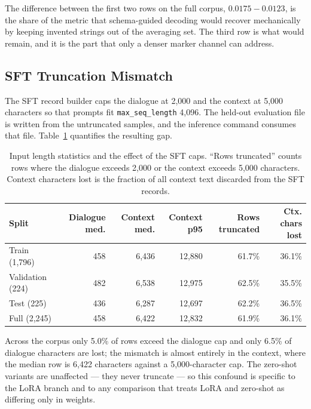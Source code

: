 \documentclass{zapiski}
\begin{document}
The difference between the first two rows on the full corpus,
$0.0175 - 0.0123$, is the share of the metric that schema-guided decoding
would recover mechanically by keeping invented strings out of the averaging
set. The third row is what would remain, and it is the part that only a denser
marker channel can address.

\subsection{SFT Truncation Mismatch}
\label{sec:appendix-truncation}

The SFT record builder caps the dialogue at 2,000 and the context at 5,000
characters so that prompts fit \texttt{max\_seq\_length} 4,096. The held-out
evaluation file is written from the untruncated samples, and the inference
command consumes that file. Table~\ref{tab:truncation} quantifies the
resulting gap.

\begin{table}[H]
\centering
\caption{Input length statistics and the effect of the SFT caps. ``Rows
truncated'' counts rows where the dialogue exceeds 2,000 or the context
exceeds 5,000 characters. Context characters lost is the fraction of all
context text discarded from the SFT records.}
\label{tab:truncation}
\footnotesize
\begin{tabular}{lrrrrr}
\toprule
Split & Dialogue med. & Context med. & Context p95 & Rows truncated & Ctx. chars lost \\
\midrule
Train (1,796)      & 458 & 6{,}436 & 12{,}880 & 61.7\% & 36.1\% \\
Validation (224)   & 482 & 6{,}538 & 12{,}975 & 62.5\% & 35.5\% \\
Test (225)         & 436 & 6{,}287 & 12{,}697 & 62.2\% & 36.5\% \\
Full (2,245)       & 458 & 6{,}422 & 12{,}832 & 61.9\% & 36.1\% \\
\bottomrule
\end{tabular}
\end{table}

Across the corpus only 5.0\% of rows exceed the dialogue cap and only 6.5\% of
dialogue characters are lost; the mismatch is almost entirely in the context,
where the
median row is 6,422 characters against a 5,000-character cap. The zero-shot
variants are unaffected --- they never truncate --- so this confound is
specific to the LoRA branch and to any comparison that treats LoRA and
zero-shot as differing only in weights.
\end{document}
